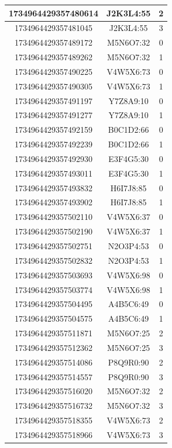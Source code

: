 \begin{table}[h]
\begin{tabular}{| c | c | c |}
		1734964429357480614 & J2K3L4:55 & 2 \\\hline
		1734964429357481045 & J2K3L4:55 & 3 \\\hline
		1734964429357489172 & M5N6O7:32 & 0 \\\hline
		1734964429357489262 & M5N6O7:32 & 1 \\\hline
		1734964429357490225 & V4W5X6:73 & 0 \\\hline
		1734964429357490305 & V4W5X6:73 & 1 \\\hline
		1734964429357491197 & Y7Z8A9:10 & 0 \\\hline
		1734964429357491277 & Y7Z8A9:10 & 1 \\\hline
		1734964429357492159 & B0C1D2:66 & 0 \\\hline
		1734964429357492239 & B0C1D2:66 & 1 \\\hline
		1734964429357492930 & E3F4G5:30 & 0 \\\hline
		1734964429357493011 & E3F4G5:30 & 1 \\\hline
		1734964429357493832 & H6I7J8:85 & 0 \\\hline
		1734964429357493902 & H6I7J8:85 & 1 \\\hline
		1734964429357502110 & V4W5X6:37 & 0 \\\hline
		1734964429357502190 & V4W5X6:37 & 1 \\\hline
		1734964429357502751 & N2O3P4:53 & 0 \\\hline
		1734964429357502832 & N2O3P4:53 & 1 \\\hline
		1734964429357503693 & V4W5X6:98 & 0 \\\hline
		1734964429357503774 & V4W5X6:98 & 1 \\\hline
		1734964429357504495 & A4B5C6:49 & 0 \\\hline
		1734964429357504575 & A4B5C6:49 & 1 \\\hline
		1734964429357511871 & M5N6O7:25 & 2 \\\hline
		1734964429357512362 & M5N6O7:25 & 3 \\\hline
		1734964429357514086 & P8Q9R0:90 & 2 \\\hline
		1734964429357514557 & P8Q9R0:90 & 3 \\\hline
		1734964429357516020 & M5N6O7:32 & 2 \\\hline
		1734964429357516732 & M5N6O7:32 & 3 \\\hline
		1734964429357518355 & V4W5X6:73 & 2 \\\hline
		1734964429357518966 & V4W5X6:73 & 3 \\\hline

\end{tabular}
\end{table}
